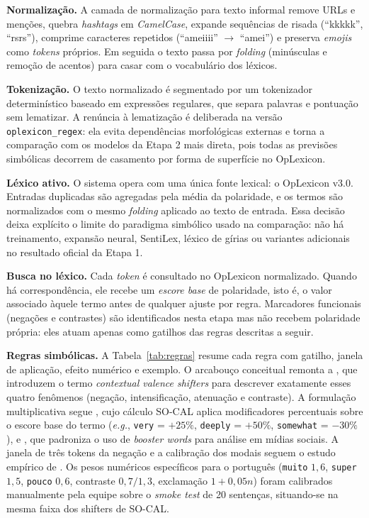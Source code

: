\documentclass[11pt,a4paper]{article}
\newenvironment{addedblock}{\par\color{newblue}}{\par\color{black}}
\begin{document}
\begin{addedblock}
\textbf{Normalização.}
A camada de normalização para texto informal remove URLs e menções, quebra \emph{hashtags} em \emph{CamelCase}, expande sequências de risada (``kkkkk'', ``rsrs''), comprime caracteres repetidos (``ameiiii'' $\rightarrow$ ``amei'') e preserva \emph{emojis} como \emph{tokens} próprios. Em seguida o texto passa por \emph{folding} (minúsculas e remoção de acentos) para casar com o vocabulário dos léxicos.

\textbf{Tokenização.}
O texto normalizado é segmentado por um tokenizador determinístico baseado em expressões regulares, que separa palavras e pontuação sem lematizar. A renúncia à lematização é deliberada na versão \texttt{oplexicon\_regex}: ela evita dependências morfológicas externas e torna a comparação com os modelos da Etapa 2 mais direta, pois todas as previsões simbólicas decorrem de casamento por forma de superfície no OpLexicon.

\textbf{Léxico ativo.}
O sistema opera com uma única fonte lexical: o OpLexicon v3.0. Entradas duplicadas são agregadas pela média da polaridade, e os termos são normalizados com o mesmo \emph{folding} aplicado ao texto de entrada. Essa decisão deixa explícito o limite do paradigma simbólico usado na comparação: não há treinamento, expansão neural, SentiLex, léxico de gírias ou variantes adicionais no resultado oficial da Etapa 1.

\textbf{Busca no léxico.}
Cada \emph{token} é consultado no OpLexicon normalizado. Quando há correspondência, ele recebe um \emph{escore base} de polaridade, isto é, o valor associado àquele termo antes de qualquer ajuste por regra. Marcadores funcionais (negações e contrastes) são identificados nesta etapa mas não recebem polaridade própria: eles atuam apenas como gatilhos das regras descritas a seguir.

\textbf{Regras simbólicas.}
A Tabela~\ref{tab:regras} resume cada regra com gatilho, janela de aplicação, efeito numérico e exemplo. O arcabouço conceitual remonta a \citet{polanyi2006valenceshifters}, que introduzem o termo \emph{contextual valence shifters} para descrever exatamente esses quatro fenômenos (negação, intensificação, atenuação e contraste). A formulação multiplicativa segue \citet{taboada2011lexicon}, cujo cálculo SO-CAL aplica modificadores percentuais sobre o escore base do termo (\textit{e.g.}, \texttt{very} = $+25\%$, \texttt{deeply} = $+50\%$, \texttt{somewhat} = $-30\%$), e \citet{hutto2014vader}, que padroniza o uso de \emph{booster words} para análise em mídias sociais. A janela de três tokens da negação e a calibração dos modais seguem o estudo empírico de \citet{kiritchenko2016effect}. Os pesos numéricos específicos para o português (\texttt{muito} $1{,}6$, \texttt{super} $1{,}5$, \texttt{pouco} $0{,}6$, contraste $0{,}7/1{,}3$, exclamação $1+0{,}05n$) foram calibrados manualmente pela equipe sobre o \emph{smoke test} de 20 sentenças, situando-se na mesma faixa dos shifters de SO-CAL.


\end{addedblock}
\end{document}
